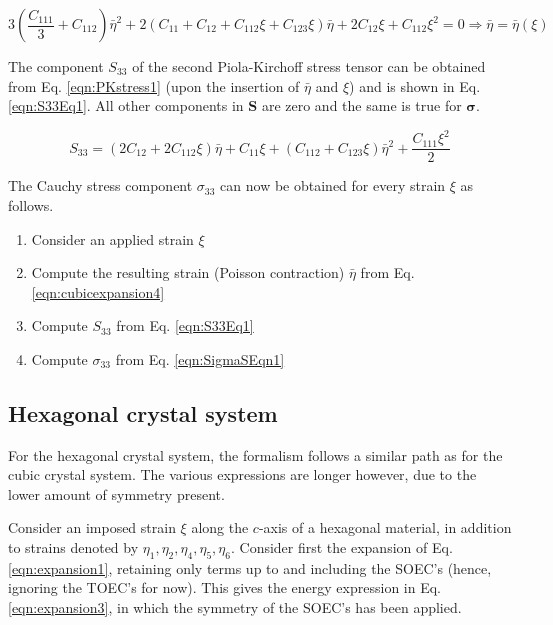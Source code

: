 \documentclass[showpacs,aps,floatfix,prb,reprint,superscriptaddress,onecolumn]{revtex4-1}
\begin{document}
\begin{equation}
\label{eqn:cubicexpansion4} 
3 \left(\frac{C_{111}}{3} + C_{112}\right) \bar{\eta}^{2} + 2 \left(C_{11} + C_{12} + C_{112} \xi + C_{123} \xi \right) \bar{\eta} + 2 C_{12} \xi + C_{112} \xi^{2} = 0 \Rightarrow \bar{\eta} = \bar{\eta} \left(\xi\right)
\end{equation}

The component $S_{33}$ of the second Piola-Kirchoff stress tensor can be obtained from Eq. \ref{eqn:PKstress1} (upon the insertion of $\bar{\eta}$ and $\xi$) and is shown in Eq. \ref{eqn:S33Eq1}. All other components in $\mathbf{S}$ are zero and the same is true for $\mathbf{\sigma}$.

\begin{equation}
\label{eqn:S33Eq1} 
S_{33} = \left(2 C_{12} + 2 C_{112} \xi \right) \bar{\eta} + C_{11} \xi + \left(C_{112} + C_{123} \xi \right) \bar{\eta}^{2} + \frac{C_{111} \xi^{2}}{2}
\end{equation}

The Cauchy stress component $\sigma_{33}$ can now be obtained for every strain $\xi$ as follows.

\begin{enumerate}
\itemsep-1.5em 
\item Consider an applied strain $\xi$
\item Compute the resulting strain (Poisson contraction) $\bar{\eta}$ from Eq. \ref{eqn:cubicexpansion4}
\item Compute $S_{33}$ from Eq. \ref{eqn:S33Eq1}
\item Compute $\sigma_{33}$ from Eq. \ref{eqn:SigmaSEqn1}
\end{enumerate}


\subsection{Hexagonal crystal system}
For the hexagonal crystal system, the formalism follows a similar path as for the cubic crystal system. The various expressions are longer however, due to the lower amount of symmetry present. 

Consider an imposed strain $\xi$ along the $c$-axis of a hexagonal material, in addition to strains denoted by $\eta_1, \eta_2, \eta_4, \eta_5, \eta_6$. Consider first the expansion of Eq. \ref{eqn:expansion1}, retaining only terms up to and including the SOEC's (hence, ignoring the TOEC's for now). This gives the energy expression in Eq. \ref{eqn:expansion3}, in which the symmetry of the SOEC's has been applied. 
\end{document}

